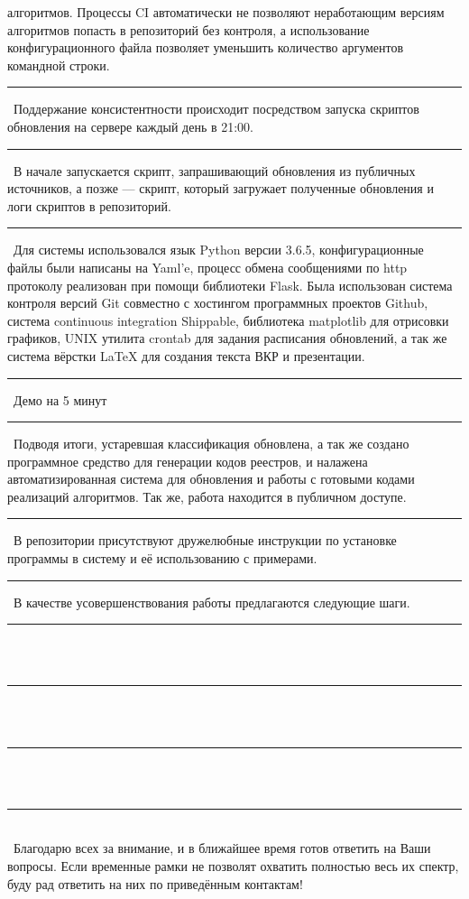 \documentclass[12pt]{article}
\renewcommand{\line}{\noindent\rule{\textwidth}{1pt}}
\begin{document}
алгоритмов. Процессы CI автоматически не позволяют неработающим версиям
алгоритмов попасть в репозиторий без контроля, а использование
конфигурационного файла позволяет уменьшить количество аргументов командной
строки.\\
\line\
Поддержание консистентности происходит посредством запуска скриптов обновления
на сервере каждый день в 21:00.\\
\line\
В начале запускается скрипт, запрашивающий обновления из публичных источников,
а позже --- скрипт, который загружает полученные обновления и логи скриптов в
репозиторий.\\
\line\
Для системы использовался язык Python версии 3.6.5, конфигурационные файлы были
написаны на Yaml'e, процесс обмена сообщениями по http протоколу реализован при
помощи библиотеки Flask. Была использован система контроля версий Git совместно
с хостингом программных проектов Github, система continuous integration
Shippable, библиотека matplotlib для отрисовки графиков, UNIX утилита crontab
для задания расписания обновлений, а так же система вёрстки {\LaTeX} для
создания текста ВКР и презентации.\\
\line\
Демо на 5 минут\\
\line\
Подводя итоги, устаревшая классификация обновлена, а так же создано программное
средство для генерации кодов реестров, и налажена автоматизированная система
для обновления и работы с готовыми кодами реализаций алгоритмов. Так же, работа
находится в публичном доступе.\\
\line\
В репозитории присутствуют дружелюбные инструкции по установке программы в
систему и её использованию с примерами.\\
\line\
В качестве усовершенствования работы предлагаются следующие шаги.\\
\line\\\
\line\\\
\line\\\
\line\\\
Благодарю всех за внимание, и в ближайшее время готов ответить на Ваши вопросы.
Если временные рамки не позволят охватить полностью весь их спектр, буду рад
ответить на них по приведённым контактам!


\end{document}
